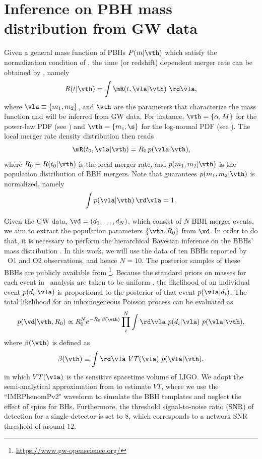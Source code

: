\documentclass[
reprint,           %
superscriptaddress,%
amsmath,           %
amssymb,           %
aps,               %
prd,               %
notitlepage,       %
longbibliography,  %
floatfix,          %
showkeys,          %
]{revtex4-1}
\def\e{\begin{equation}}
\def\q{\end{equation}}
\begin{document}
\section{\label{method}Inference on PBH mass distribution from GW data}
Given a general mass function of PBHs $P(m|\vth)$ which satisfy the normalization
condition of , the time (or redshift) dependent merger rate can be
obtained by , namely
\e\label{Rt2}
R(t|\vth) = \int \mR(t, \vla|\vth)\ \rd \vla,
\q 
where $\vla \equiv \{m_1, m_2\}$, and $\vth$ are the parameters that 
characterize the mass function and will be inferred from GW data. 
For instance, $\vth=\{\alpha, M\}$ for the power-law PDF (see ) 
and $\vth=\{m_c, \s\}$ for the log-normal PDF (see ).
The local merger rate density distribution then reads \cite{Chen:2018rzo}
\e\label{Rt0} 
\mR(t_0, \vla|\vth) = R_0\, p(\vla|\vth),
\q 
where $R_0 \equiv R(t_0|\vth)$ is the local merger rate, and $p(m_1,m_2|\vth)$ 
is the population distribution of BBH mergers.
Note that  guarantees $p(m_1,m_2|\vth)$ is normalized, namely
\e 
    \int p(\vla|\vth)\, \rd \vla = 1.
\q 

Given the GW data, $\vd = (d_1, \dots, d_N)$, which consist of $N$ BBH merger
events, we aim to extract the population parameters $\{\vth, R_0\}$ from $\vd$.
In order to do that, it is necessary to perform the hierarchical Bayesian inference
on the BBHs' mass distribution 
\cite{Abbott:2016nhf,Abbott:2016drs,TheLIGOScientific:2016pea,
    Wysocki:2018mpo,Fishbach:2018edt,Mandel:2018mve,Thrane:2018qnx}.
In this work, we will use the data of ten BBHs
\cite{TheLIGOScientific:2016pea,LIGOScientific:2018mvr} 
reported by \lvc\ O1 and O2 observations, and hence $N=10$. 
The posterior samples of these BBHs are publicly available from \footnote{\url{https://www.gw-openscience.org/}}. 
Because the standard priors on masses for each event in \lvc\ analysis are 
taken to be uniform \cite{TheLIGOScientific:2016pea,LIGOScientific:2018mvr},
the likelihood of an individual event $p(d_i|\vla)$ is
proportional to the posterior of that event $p(\vla|d_i)$.
The total likelihood for an inhomogeneous Poisson process can be evaluated as
\cite{Wysocki:2018mpo,Fishbach:2018edt,Mandel:2018mve,Thrane:2018qnx}
\e\label{likelihood}
p(\vd|\vth, R_0) \propto R_0^{N} e^{-R_0\, \beta(\vth)} \prod_i^N 
\int \rd\vla\ p(d_i|\vla)\ p(\vla|\vth),
\q 
where $\beta(\vth)$ is defined as
\e 
\beta(\vth) \equiv \int \rd\vla\ VT(\vla)\ p(\vla|\vth),
\q 
in which $VT(\vla)$ is the sensitive spacetime volume \cite{Abbott:2016nhf,Abbott:2016drs} of LIGO.
We adopt the semi-analytical approximation from 
\cite{Abbott:2016nhf,Abbott:2016drs} to estimate $VT$, 
where we use the ``IMRPhenomPv2" waveform to simulate the BBH templates
and neglect the effect of spins for BHs.
Furthermore, the threshold signal-to-noise ratio (SNR) of detection for a 
single-detector is set to $8$,
which corresponds to a network SNR threshold of around $12$.
\end{document}
